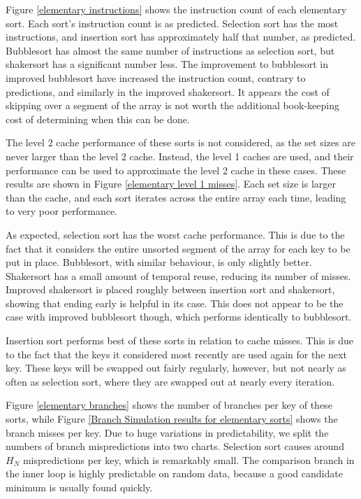 Figure \ref{elementary instructions} shows the instruction count of each
elementary sort. Each sort's instruction count is as predicted. Selection sort
has the most instructions, and insertion sort has approximately half that
number, as predicted. Bubblesort has almost the same number of instructions as
selection sort, but shakersort has a significant number less. The improvement to
bubblesort in improved bubblesort have increased the instruction count, contrary to
predictions, and similarly in the improved shakersort. It appears the cost of
skipping over a segment of the array is not worth the additional book-keeping
cost of determining when this can be done.

The level 2 cache performance of these sorts is not considered, as the set sizes
are never larger than the level 2 cache. Instead, the level 1 caches are used,
and their performance can be used to approximate the level 2 cache in these
cases. These results are shown in Figure \ref{elementary level 1 misses}. Each
set size is larger than the cache, and each sort iterates across the entire
array each time, leading to very poor performance.

As expected, selection sort has the worst cache performance. This is due to the
fact that it considers the entire unsorted segment of the array for each key to
be put in place. Bubblesort, with similar behaviour, is only slightly better.
Shakersort has a small amount of temporal reuse, reducing its number of misses.
Improved shakersort is placed roughly between insertion sort and shakersort,
showing that ending early is helpful in its case. This does not appear to be the
case with improved bubblesort though, which performs identically to bubblesort.

Insertion sort performs best of these sorts in relation to cache misses. This
is due to the fact that the keys it considered most recently are used again for
the next key. These keys will be swapped out fairly regularly, however, but not
nearly as often as selection sort, where they are swapped out at nearly every
iteration.

Figure \ref{elementary branches} shows the number of branches per key of these
sorts, while Figure \ref{Branch Simulation results for elementary sorts} shows
the branch misses per key. Due to huge variations in predictability, we split
the numbers of branch mispredictions into two charts. Selection sort causes
around $H_N$ mispredictions per key, which is remarkably small. The comparison
branch in the inner loop is highly predictable on random data, because a good
candidate minimum is usually found quickly.

